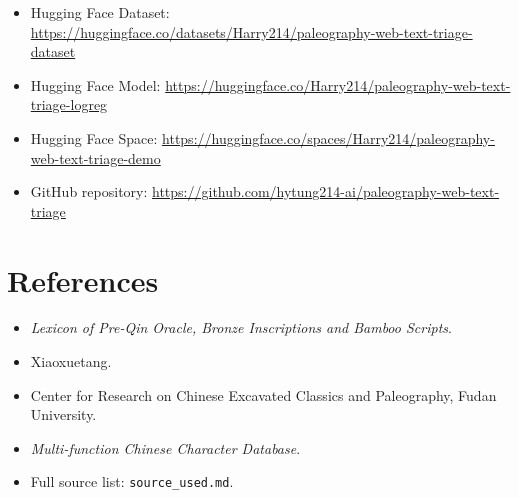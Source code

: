 \documentclass[11pt,a4paper]{article}
\begin{document}
\begin{itemize}
  \item Hugging Face Dataset: \url{https://huggingface.co/datasets/Harry214/paleography-web-text-triage-dataset}
  \item Hugging Face Model: \url{https://huggingface.co/Harry214/paleography-web-text-triage-logreg}
  \item Hugging Face Space: \url{https://huggingface.co/spaces/Harry214/paleography-web-text-triage-demo}
  \item GitHub repository: \url{https://github.com/hytung214-ai/paleography-web-text-triage}
\end{itemize}

\section*{References}

\begin{itemize}
  \item \textit{Lexicon of Pre-Qin Oracle, Bronze Inscriptions and Bamboo Scripts}.
  \item Xiaoxuetang.
  \item Center for Research on Chinese Excavated Classics and Paleography, Fudan University.
  \item \textit{Multi-function Chinese Character Database}.
  \item Full source list: \texttt{source\_used.md}.
\end{itemize}
\end{document}
